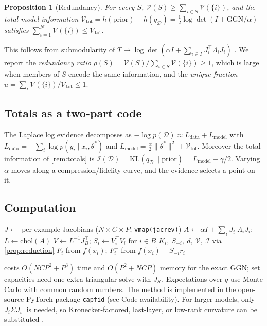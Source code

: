 \documentclass[10pt,twocolumn,letterpaper]{article}
\newtheorem{proposition}{Proposition}
\theoremstyle{definition}
\newcommand{\KL}{\mathrm{KL}}
\newcommand{\logdet}{\log\det}
\newcommand{\Vol}{\mathcal{V}}
\newcommand{\Inf}{\mathcal{I}}
\newcommand{\D}{\mathcal{D}}
\newcommand{\T}{^{\top}}
\newcommand{\dof}{d}
\begin{document}
\begin{proposition}[Redundancy]\label{prop:submod}
For every $S$, $\Vol(S)\ge\sum_{i\in S}\Vol(\{i\})$, and the total model information $\Vol_{\mathrm{tot}}=h(\text{prior})-h(q_\D)=\tfrac12\logdet(I+\mathrm{GGN}/\alpha)$ satisfies $\sum_{i=1}^N\Vol(\{i\})\le\Vol_{\mathrm{tot}}$.
\end{proposition}
This follows from submodularity of $T\mapsto\logdet(\alpha I+\sum_{i\in T}J_i\T\Lambda_iJ_i)$ \citep{krause2008}. We report the \emph{redundancy ratio} $\rho(S)=\Vol(S)/\sum_{i\in S}\Vol(\{i\})\ge1$, which is large when members of $S$ encode the same information, and the \emph{unique fraction} $u=\sum_i\Vol(\{i\})/\Vol_{\mathrm{tot}}\le1$.

\subsection{Totals as a two-part code}\label{sec:mdl}
The Laplace log evidence decomposes as $-\log p(\D)\approx L_{\text{data}}+L_{\text{model}}$ with $L_{\text{data}}=-\sum_i\log p(y_i\mid x_i,\theta^*)$ and $L_{\text{model}}=\tfrac{\alpha}{2}\|\theta^*\|^2+\Vol_{\mathrm{tot}}$. Moreover the total information of \cref{rem:totals} is $\Inf(\D)=\KL(q_\D\|\text{prior})=L_{\text{model}}-\gamma/2$. Varying $\alpha$ moves along a compression/fidelity curve, and the evidence selects a point on it.

\subsection{Computation}\label{sec:compute}
\begin{algorithm}[t]
\caption{Per-example capacity and fidelity}\label{alg:main}
\begin{algorithmic}[1]
\State $J\gets$ per-example Jacobians ($N\times C\times P$; \texttt{vmap(jacrev)})
\State $A\gets\alpha I+\sum_i J_i\T\Lambda_iJ_i$;\; $L\gets\mathrm{chol}(A)$
  \State $V\gets L^{-1}J_B\T$;\; $S_i\gets V_i\T V_i$ for $i\in B$
\EndFor
{}
  \State $K_i,\ S_{-i},\ \dof,\ \Vol,\ \Inf$ via \cref{prop:reduction}
  \State $F_i$ from $f(x_i)$;\; $F_i^{-}$ from $f(x_i)+S_{-i}r_i$
\EndFor
\end{algorithmic}
\end{algorithm}
 costs $O(NCP^2+P^3)$ time and $O(P^2+NCP)$ memory for the exact GGN; set capacities need one extra triangular solve with $J_S\T$. Expectations over $q$ use Monte Carlo with common random numbers. The method is implemented in the open-source PyTorch package \texttt{capfid} (see Code availability). For larger models, only $J_i\Sigma J_i\T$ is needed, so Kronecker-factored, last-layer, or low-rank curvature can be substituted \citep{martens2015,ritter2018,daxberger2021}.
\end{document}
